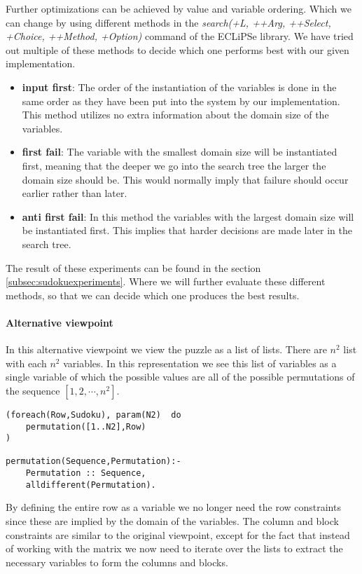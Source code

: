 Further optimizations can be achieved by value and variable ordering.
Which we can change by using different methods in the \textsl{search(+L, ++Arg, ++Select, +Choice, ++Method, +Option)} command of the ECLiPSe library. 
We have tried out multiple of these methods to decide which one performs best with our given implementation.
\begin{itemize}
\item \textbf{input first}: The order of the instantiation of the variables is done in the same order as they have been put into the system by our implementation. This method utilizes no extra information about the domain size of the variables.
\item \textbf{first fail}: The variable with the smallest domain size will be instantiated first, meaning that the deeper we go into the search tree the larger the domain size should be. This would normally imply that failure should occur earlier rather than later. 
\item \textbf{anti first fail}: In this method the variables with the largest domain size will be instantiated first. This implies that harder decisions are made later in the search tree.
\end{itemize}

The result of these experiments can be found in the section \ref{subsec:sudokuexperiments}.
Where we will further evaluate these different methods, so that we can decide which one produces the best results.

\paragraph*{Alternative viewpoint}

In this alternative viewpoint we view the puzzle as a list of lists.
There are $n^2$ list with each $n^{2}$ variables.
In this representation we see this list of variables as a single variable of which the possible values are all of the possible permutations of the sequence $[1,2,\cdots,n^{2}]$. \\

\begin{lstlisting}
(foreach(Row,Sudoku), param(N2)  do
	permutation([1..N2],Row)
)

permutation(Sequence,Permutation):-
	Permutation :: Sequence,
	alldifferent(Permutation).
\end{lstlisting}

By defining the entire row as a variable we no longer need the row constraints since these are implied by the domain of the variables.
The column and block constraints are similar to the original viewpoint, except for the fact that instead of working with the matrix we now need to iterate over the lists to extract the necessary variables to form the columns and blocks.

